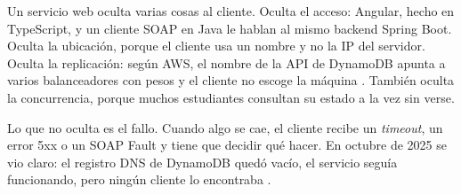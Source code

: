Un servicio web oculta varias cosas al cliente. Oculta el acceso: Angular, hecho en TypeScript, y un cliente SOAP en Java le hablan al mismo backend Spring Boot. Oculta la ubicación, porque el cliente usa un nombre y no la IP del servidor. Oculta la replicación: según AWS, el nombre de la API de DynamoDB apunta a varios balanceadores con pesos y el cliente no escoge la máquina \cite{aws2025}. También oculta la concurrencia, porque muchos estudiantes consultan su estado a la vez sin verse.

Lo que no oculta es el fallo. Cuando algo se cae, el cliente recibe un \emph{timeout}, un error 5xx o un SOAP Fault y tiene que decidir qué hacer. En octubre de 2025 se vio claro: el registro DNS de DynamoDB quedó vacío, el servicio seguía funcionando, pero ningún cliente lo encontraba \cite{aws2025}.
